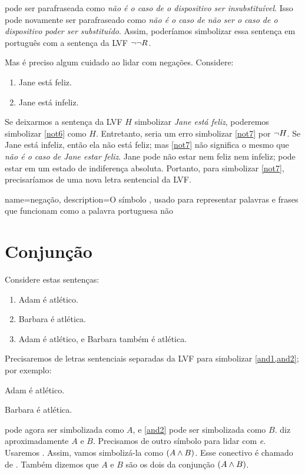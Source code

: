  pode ser parafraseada como \emph{não é o caso de o
dispositivo ser insubstituível}. Isso pode novamente ser parafraseado
como \emph{não é o caso de não ser o caso de o dispositivo poder ser
substituído}. Assim, poderíamos simbolizar essa sentença em português
com a sentença da LVF $\neg\neg R$.

Mas é preciso algum cuidado ao lidar com negações. Considere:
	\begin{enumerate}
		\item\label{not6} Jane está feliz.
		\item\label{not7} Jane está infeliz.
	\end{enumerate}
Se deixarmos a sentença da LVF $H$ simbolizar \emph{Jane está feliz},
poderemos simbolizar \cref*{not6} como $H$. Entretanto, seria um erro
simbolizar \cref*{not7} por $\neg{H}$. Se Jane está infeliz, então ela
não está feliz; mas \cref*{not7} não significa o mesmo que \emph{não é o
caso de Jane estar feliz}. Jane pode não estar nem feliz nem infeliz;
pode estar em um estado de indiferença absoluta. Portanto, para
simbolizar \cref*{not7}, precisaríamos de uma nova letra sentencial da
LVF.

{
name=negação,
description={O símbolo \enot, usado para representar palavras e frases que funcionam como a palavra portuguesa não}
}

\section{Conjunção}
\label{s:ConnectiveConjunction}

Considere estas sentenças:
	\begin{enumerate}
		\item\label{and1}Adam é atlético.
		\item\label{and2}Barbara é atlética.
		\item\label{and3}Adam é atlético, e Barbara também é atlética.
	\end{enumerate}
Precisaremos de letras sentenciais separadas da LVF para simbolizar
\cref*{and1,and2}; por exemplo:
	\begin{ekey}
		\item[A] Adam é atlético.
		\item[B] Barbara é atlética.
	\end{ekey}
 pode agora ser simbolizada como $A$, e \cref*{and2} pode
ser simbolizada como $B$.  diz aproximadamente $A$ e $B$.
Precisamos de outro símbolo para lidar com \emph{e}. Usaremos
\emph{\eand}. Assim, vamos simbolizá-la como $(A\wedge B)$. Esse
conectivo é chamado de . Também dizemos que
$A$ e $B$ são os dois  da conjunção $(A \wedge B)$.

